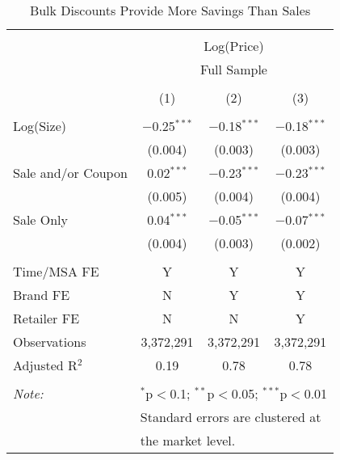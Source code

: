 
\begin{table}[!htbp] \centering 
  \caption{Bulk Discounts Provide More Savings Than Sales} 
  \label{tab:bulkDiscountSale} 
\begin{tabular}{@{\extracolsep{5pt}}lccc} 
\\[-1.8ex]\hline 
\hline \\[-1.8ex] 
 & \multicolumn{3}{c}{Log(Price)} \\ 
\cline{2-4} 
 & \multicolumn{3}{c}{Full Sample} \\ 
\\[-1.8ex] & (1) & (2) & (3)\\ 
\hline \\[-1.8ex] 
 Log(Size) & $-$0.25$^{***}$ & $-$0.18$^{***}$ & $-$0.18$^{***}$ \\ 
  & (0.004) & (0.003) & (0.003) \\ 
  Sale and/or Coupon & 0.02$^{***}$ & $-$0.23$^{***}$ & $-$0.23$^{***}$ \\ 
  & (0.005) & (0.004) & (0.004) \\ 
  Sale Only & 0.04$^{***}$ & $-$0.05$^{***}$ & $-$0.07$^{***}$ \\ 
  & (0.004) & (0.003) & (0.002) \\ 
 \hline \\[-1.8ex] 
Time/MSA FE & Y & Y & Y \\ 
Brand FE & N & Y & Y \\ 
Retailer FE & N & N & Y \\ 
Observations & 3,372,291 & 3,372,291 & 3,372,291 \\ 
Adjusted R$^{2}$ & 0.19 & 0.78 & 0.78 \\ 
\hline 
\hline \\[-1.8ex] 
\textit{Note:}  & \multicolumn{3}{l}{$^{*}$p$<$0.1; $^{**}$p$<$0.05; $^{***}$p$<$0.01} \\ 
 & \multicolumn{3}{l}{Standard errors are clustered at} \\ 
 & \multicolumn{3}{l}{the market level.} \\ 
\end{tabular} 
\end{table} 
